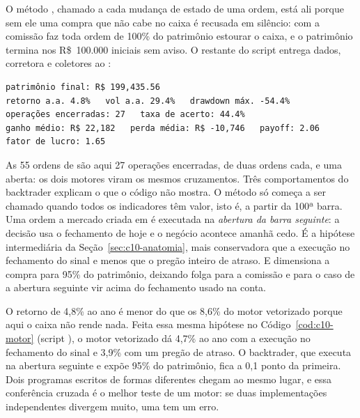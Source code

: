 O método , chamado a cada mudança de estado de uma ordem, está ali porque sem ele uma compra que não cabe no caixa é recusada em silêncio: com  a comissão faz toda ordem de 100\% do patrimônio estourar o caixa, e o patrimônio termina nos R\$~100.000 iniciais sem aviso. O restante do script entrega dados, corretora e coletores ao :


\begin{lstlisting}[style=saida]
patrimônio final: R$ 199,435.56
retorno a.a. 4.8%   vol a.a. 29.4%   drawdown máx. -54.4%
operações encerradas: 27   taxa de acerto: 44.4%
ganho médio: R$ 22,182   perda média: R$ -10,746   payoff: 2.06
fator de lucro: 1.65
\end{lstlisting}

As 55 ordens de  são aqui 27 operações encerradas, de duas ordens cada, e uma aberta: os dois motores viram os mesmos cruzamentos. Três comportamentos do backtrader explicam o que o código não mostra. O método  só começa a ser chamado quando todos os indicadores têm valor, isto é, a partir da 100ª barra. Uma ordem a mercado criada em  é executada na \emph{abertura da barra seguinte}: a decisão usa o fechamento de hoje e o negócio acontece amanhã cedo. É a hipótese intermediária da Seção~\ref{sec:c10-anatomia}, mais conservadora que a execução no fechamento do sinal e menos que o pregão inteiro de atraso. E  dimensiona a compra para 95\% do patrimônio, deixando folga para a comissão e para o caso de a abertura seguinte vir acima do fechamento usado na conta.

O retorno de 4,8\% ao ano é menor do que os 8,6\% do motor vetorizado porque aqui o caixa não rende nada. Feita essa mesma hipótese no Código~\ref{cod:c10-motor} (script ), o motor vetorizado dá 4,7\% ao ano com a execução no fechamento do sinal e 3,9\% com um pregão de atraso. O backtrader, que executa na abertura seguinte e expõe 95\% do patrimônio, fica a 0,1 ponto da primeira. Dois programas escritos de formas diferentes chegam ao mesmo lugar, e essa conferência cruzada é o melhor teste de um motor: se duas implementações independentes divergem muito, uma tem um erro.

